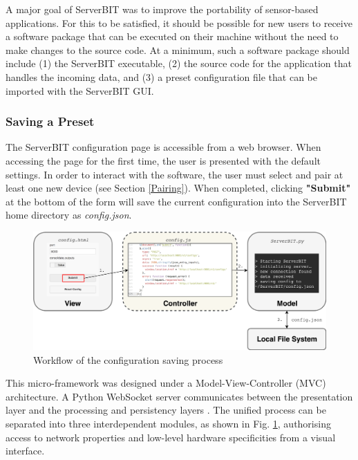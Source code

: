 A major goal of ServerBIT was to improve the portability of sensor-based applications. For this to be satisfied, it should be possible for new users to receive a software package that can be executed on their machine without the need to make changes to the source code. At a minimum, such a software package should include (1) the ServerBIT executable, (2) the source code for the application that handles the incoming data, and (3) a preset configuration file that can be imported with the ServerBIT GUI.

\subsubsection{Saving a Preset}

The ServerBIT configuration page is accessible from a web browser. When accessing the page for the first time, the user is presented with the default settings. In order to interact with the software, the user must select and pair at least one new device (see Section \ref{Pairing}). When completed, clicking \textbf{"Submit"} at the bottom of the form will save the current configuration into the ServerBIT home directory as \textit{config.json}.

\begin{figure}[htb!]
    \centering
    \includegraphics[width=\textwidth]{Chapters/Figures/technical/ServerBIT/Websockets_ctrl.png}
    \caption{Workflow of the configuration saving process}
    \label{fig:MVC_Diagram}
\end{figure}

This micro-framework was designed under a Model-View-Controller (MVC) architecture. A Python WebSocket server communicates between the presentation layer and the processing and persistency layers \cite{da_silva_web-based_2012}. The unified process can be separated into three interdependent modules, as shown in Fig. \ref{fig:MVC_Diagram}, authorising access to network properties and low-level hardware specificities from a visual interface.

